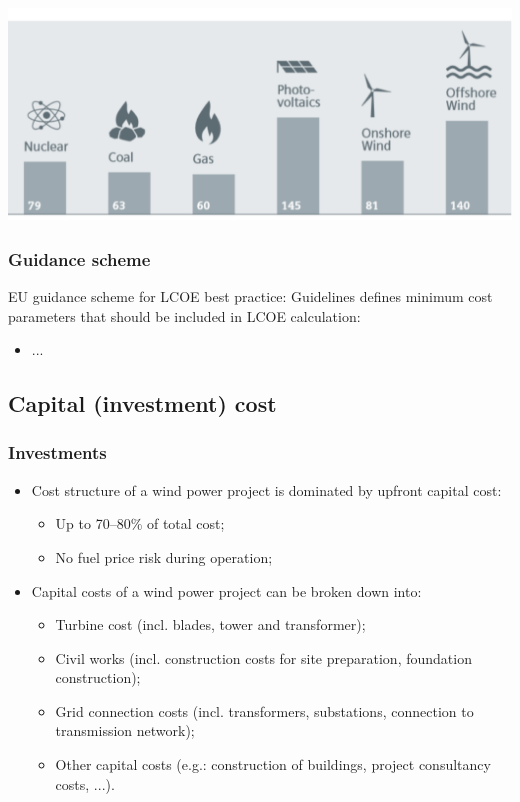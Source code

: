 \documentclass{article}
\begin{document}
\begin{center}
    \includegraphics[width=.8\textwidth]{media/energy_lcoe.png}
\end{center}

\subsubsection{Guidance scheme}
EU guidance scheme for LCOE best practice:
Guidelines defines minimum cost parameters that should be included in LCOE calculation:
\begin{itemize}
    \item ...
\end{itemize}

\subsection{Capital (investment) cost}
\subsubsection{Investments}
\begin{itemize}
    \item Cost structure of a wind power project is dominated by upfront capital cost:
    \begin{itemize}[label=$\circ$]
        \item Up to 70--80\% of total cost;
        \item No fuel price risk during operation;
    \end{itemize}
    \item Capital costs of a wind power project can be broken down into:
    \begin{itemize}[label=$\circ$]
        \item Turbine cost (incl. blades, tower and transformer);
        \item Civil works (incl. construction costs for site preparation, foundation construction);
        \item Grid connection costs (incl. transformers, substations, connection to transmission network);
        \item Other capital costs (e.g.: construction of buildings, project consultancy costs, ...).
    \end{itemize}
\end{itemize}
\end{document}
